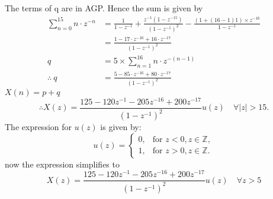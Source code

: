 \documentclass[journal,12pt,twocolumn]{IEEEtran}
\theoremstyle{remark}
\begin{document}
The terms of q are in AGP. Hence the sum is given by
\begin{align}
  \sum_{n=0}^{15}n\cdot z^{-n}&= \frac{1}{1 - z^{-1} }+ \frac{z^{-1}(1 - z^{-15})}{(1 - z^{-1})^2}-\frac{(1+(16-1)1)\times z^{-16}}{1-z^{-1}} \\
  &=\frac{1-17\cdot z^{-16}+16\cdot z^{-17}}{(1-z^{-1})^{2}}\\
q&=5\times \sum_{n=1}^{16}n\cdot z^{-(n-1)}\\
\therefore \ q&=\frac{5-85\cdot z^{-16}+80\cdot z^{-17}}{(1-z^{-1})^{2}}
\end{align}
$X(n)=p+q$
\begin{equation}
\therefore X(z) = \frac{125 -120 z^{-1}-205 z^{-16}+200 z^{-17}}{(1-z^{-1})^2} u(z) \quad \forall \lvert z \rvert > 15.
\end{equation}
The expression for \( u(z) \) is given by:
\[
u(z) = 
\begin{cases}
    0, & \text{for } z < 0, z \in \mathbb{Z}, \\
    1, & \text{for } z > 0, z \in \mathbb{Z}.
\end{cases}
\]
now the expression simplifies to 
\begin {equation}
X(z) = \frac{125 -120 z^{-1}-205 z^{-16}+200 z^{-17}}{(1-z^{-1})^2} u(z) \quad \forall z>5
\end {equation}
\end{document}
